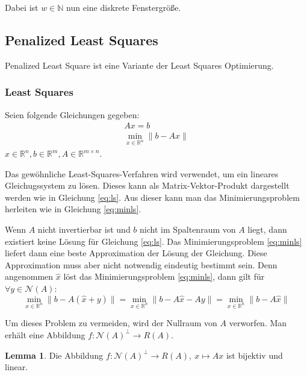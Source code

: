 \documentclass{article}
\newcommand{\R}[0]{\mathbb{R}}
\theoremstyle{plain}
\theoremstyle{definition}
\newtheorem{lemma}[thm]{Lemma}
\begin{document}
Dabei ist $w \in \mathbb{N}$ nun eine diskrete Fenstergröße.

\subsection{Penalized Least Squares}
Penalized Least Square ist eine Variante der Least Squares Optimierung.

\subsubsection{Least Squares}
Seien folgende Gleichungen gegeben:
\begin{align}
    Ax = b \label{eq:ls} \\ 
    \min\limits_{x \in \R^n} \lVert b - Ax \rVert \label{eq:minls}
\end{align}
$x \in \R^n, b \in \R^m, A \in \R^{m\times n}$.

Das gewöhnliche Least-Squares-Verfahren wird verwendet, um ein lineares Gleichugssystem zu lösen. 
Dieses kann als Matrix-Vektor-Produkt dargestellt werden wie in Gleichung \ref{eq:ls}. 
Aus dieser kann man das Minimierungsproblem herleiten wie in Gleichung \ref{eq:minls}.

Wenn $A$ nicht invertierbar ist und $b$ nicht im Spaltenraum von $A$ liegt, dann existiert keine Lösung für Gleichung \ref{eq:ls}.
Das Minimierungsproblem \ref{eq:minls} liefert dann eine beste Approximation der Lösung der Gleichung. 
Diese Approximation muss aber nicht notwendig eindeutig bestimmt sein. 
Denn angenommen $\hat{x}$ löst das Minimierungsproblem \ref{eq:minls}, dann gilt für $\forall y \in \mathcal{N}(A)$:
\begin{equation}
    \min\limits_{x \in \R^n} \lVert b - A(\hat{x} + y) \rVert = \min\limits_{x \in \R^n} \lVert b - A\hat{x} - Ay \rVert = \min\limits_{x \in \R^n} \lVert b - A\hat{x} \rVert
\end{equation}

Um dieses Problem zu vermeiden, wird der Nullraum von $A$ verworfen. 
Man erhält eine Abbildung $f: \mathcal{N}(A)^{\bot} \to R(A)$.

\begin{lemma}\label{lem:fbij}
    Die Abbildung $f: \mathcal{N}(A)^{\bot} \to R(A),\: x \mapsto Ax$ ist bijektiv und linear.
\end{lemma}
\end{document}

